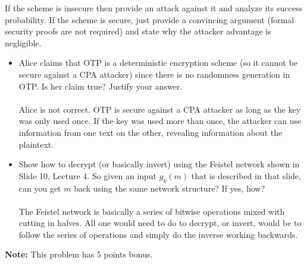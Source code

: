 \documentclass[12pt]{article}
\begin{document}
 If the scheme is insecure then provide an attack against it and analyze its success probability. If the scheme is secure, just provide a convincing argument (formal security proofs are not required) and state why the attacker advantage is negligible.
\newpage
{}
\begin{itemize}
    \item Alice claims that OTP is a deterministic encryption scheme (so it cannot be secure against a CPA attacker) since there is no randomness generation in OTP. Is her claim true? Justify your answer.
    \\\\Alice is not correct. OTP is secure against a CPA attacker as long as the key was only used once. If the key was used
    more than once, the attacker can use information from one text on the other, revealing information about the plaintext.
    \item Show how to decrypt (or basically invert) using the Feistel network shown in Slide 10, Lecture 4. So given an input $g_k(m)$ that is described in that slide, can you get $m$ back using the same network structure? If yes, how?  
    \\\\The Feistel network is basically a series of bitwise operations mixed with cutting in halves. All one would need to do to
    decrypt, or invert, would be to follow the series of operations and simply do the inverse working backwards. 
\end{itemize}

\textbf{Note:} This problem has 5 points bonus.
\end{document}

